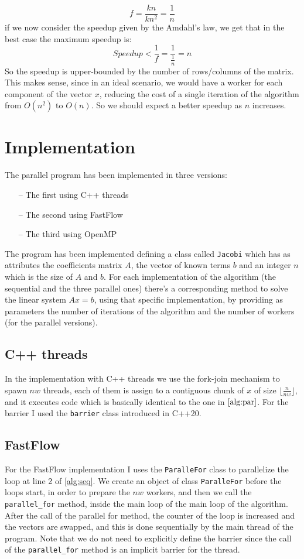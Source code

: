 \documentclass[12pt]{article}
\begin{document}
	\[ f = \frac{kn}{kn^2} = \frac{1}{n}\]
	if we now consider the speedup given by the Amdahl's law, we get that in the best case the maximum speedup is:
	\[ Speedup < \frac{1}{f} = \frac{1}{\frac{1}{n}} = n\]
	So the speedup is upper-bounded by the number of rows/columns of the matrix. This makes sense, since in an ideal scenario, we would have a worker for each component of the vector $x$, reducing the cost of a single iteration of the algorithm from $O(n^2)$ to $O(n)$. So we should expect a better speedup as $n$ increases. 
	
	
	\section{Implementation}
	The parallel program has been implemented in three versions:
	\begin{itemize}
		\item[--] The first using C++ threads 
		\item[--] The second using FastFlow
		\item[--] The third using OpenMP
	\end{itemize}
	The program has been implemented defining a class called \verb|Jacobi| which has as attributes the coefficients matrix $A$, the vector of known terms $b$ and an integer $n$ which is the size of $A$ and $b$. For each implementation of the algorithm (the sequential and the three parallel ones) there's a corresponding method to solve the linear system $Ax = b$, using that specific implementation, by providing as parameters the number of iterations of the algorithm and the number of workers (for the parallel versions).
	
	\subsection{C++ threads}
	In the implementation with C++ threads we use the fork-join mechanism to spawn $nw$ threads, each of them is assign to a contiguous chunk of $x$ of size $\lfloor\frac{n}{nw}\rfloor$, and it executes code which is basically identical to the one in $\ref{alg:par}$. For the barrier I used the \verb*|barrier| class introduced in C++20.
	\subsection{FastFlow}
	For the FastFlow implementation I uses the \verb|ParalleFor| class to parallelize the loop at line 2 of \ref{alg:seq}. We create an object of class \verb|ParalleFor| before the loops start, in order to prepare the $nw$ workers, and then we call the \verb*|parallel_for| method, inside the main loop of the main loop of the algorithm. After the call of the parallel for method, the counter of the loop is increased and the vectors are swapped, and this is done sequentially by the main thread of the program. Note that we do not need to explicitly define the barrier since the call of the \verb*|parallel_for| method is an implicit barrier for the thread. 
\end{document}
